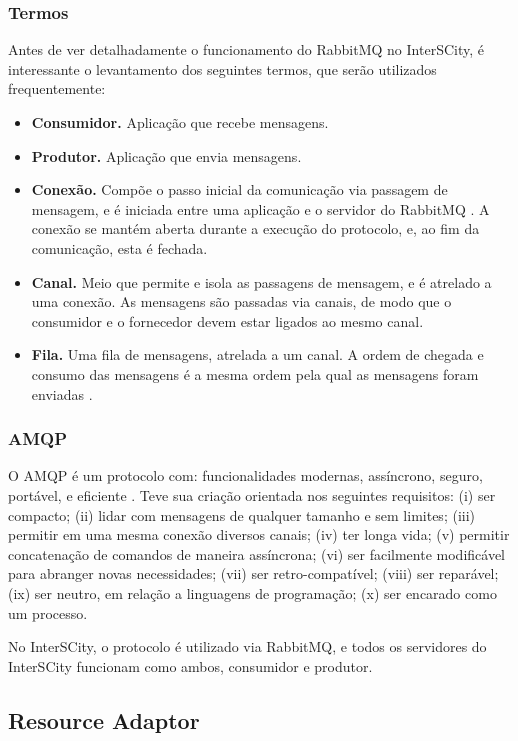\subsubsection{Termos}
Antes de ver detalhadamente o funcionamento do RabbitMQ no InterSCity, é
interessante o levantamento dos seguintes termos, que serão utilizados
frequentemente:

\begin{itemize}
\item \textbf{Consumidor.} Aplicação que recebe mensagens.
\item \textbf{Produtor.} Aplicação que envia mensagens.
\item \textbf{Conexão.} Compõe o passo inicial da comunicação via passagem
de mensagem, e é iniciada entre uma aplicação e o servidor do
RabbitMQ \cite{amqp2008}. A conexão se mantém aberta durante a execução do
protocolo, e, ao fim da comunicação, esta é fechada.
\item \textbf{Canal.} Meio que permite e isola as passagens de mensagem, e é
atrelado a uma conexão. As mensagens são passadas via canais, de modo que
o consumidor e o fornecedor devem estar ligados ao mesmo canal.
\item \textbf{Fila.} Uma fila de mensagens, atrelada a um canal. A ordem de
chegada e consumo das mensagens é a mesma ordem pela qual as mensagens foram
enviadas \cite{amqp2008}.
\end{itemize}

\subsubsection{AMQP}

O AMQP é um protocolo com: funcionalidades modernas, assíncrono, seguro,
portável, e eficiente \cite{amqp2008}. Teve sua criação orientada nos seguintes
requisitos:
(i) ser compacto;
(ii) lidar com mensagens de qualquer tamanho e sem limites;
(iii) permitir em uma mesma conexão diversos canais;
(iv) ter longa vida;
(v) permitir concatenação de comandos de maneira assíncrona;
(vi) ser facilmente modificável para abranger novas necessidades;
(vii) ser retro-compatível;
(viii) ser reparável;
(ix) ser neutro, em relação a linguagens de programação;
(x) ser encarado como um processo.

No InterSCity, o protocolo é utilizado via RabbitMQ, e todos os servidores do
InterSCity funcionam como ambos, consumidor e produtor. 

\subsection{Resource Adaptor}

